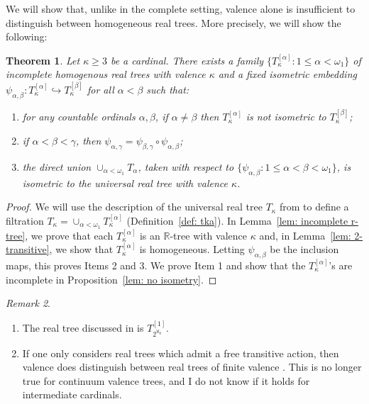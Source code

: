 \documentclass[11pt]{article}
\newtheorem{theorem}{Theorem}[section]
\theoremstyle{definition}
\theoremstyle{remark}
\newtheorem{remark}[theorem]{Remark}
\begin{document}
We will show that, unlike in the complete setting, valence alone is insufficient to distinguish between homogeneous real trees. More precisely, we will show the following:

\begin{theorem}
    Let $\kappa \geq 3$ be a cardinal. There exists a family $\{T_\kappa^{[\alpha]} : 1 \leq \alpha < \omega_1\}$ of incomplete homogenous real trees with valence $\kappa$ and a fixed isometric embedding $\psi_{\alpha,\beta}: T_\kappa^{[\alpha]} \hookrightarrow T_\kappa^{[\beta]}$ for all $\alpha < \beta$ such that:
    \begin{enumerate}
        \item for any countable ordinals $\alpha, \beta$, if $\alpha \neq \beta$ then $T_\kappa^{[\alpha]}$ is not isometric to $T_\kappa^{[\beta]}$;
        \item if $\alpha < \beta < \gamma$, then $\psi_{\alpha,\gamma} = \psi_{\beta,\gamma} \circ \psi_{\alpha,\beta}$;
        \item the direct union $\cup_{\alpha < \omega_1} T_\alpha$, taken with respect to $\{\psi_{\alpha,\beta} : 1 \leq \alpha < \beta < \omega_1\}$, is isometric to the universal real tree with valence $\kappa$.
    \end{enumerate}
\end{theorem}

\begin{proof}
	We will use the description of the universal real tree $T_\kappa$ from \cite{DyubinaExplicit01} to define a filtration $T_\kappa = \cup_{\alpha < \omega_1} T_\kappa^{[\alpha]}$ (Definition~\ref{def: tka}). In Lemma~\ref{lem: incomplete r-tree}, we prove that each $T_\kappa^{[\alpha]}$ is an $\mathbb{R}$-tree with valence $\kappa$ and, in Lemma~\ref{lem: 2-transitive}, we show that $T_\kappa^{[\alpha]}$ is homogeneous. Letting $\psi_{\alpha,\beta}$ be the inclusion maps, this proves Items 2 and 3. We prove Item 1 and show that the $T_\kappa^{[\alpha]}$'s are incomplete in Proposition~\ref{lem: no isometry}.
\end{proof}

\begin{remark}
    \begin{enumerate}
        \item The real tree discussed in \cite{BerestovskiuiUryson19} is $T_{2^{\aleph_0}}^{[1]}$.
        \item If one only considers real trees which admit a free transitive action, then valence does distinguish between real trees of finite valence \cite[Theorem~C]{AzuelosGuide25}. This is no longer true for continuum valence trees, and I do not know if it holds for intermediate cardinals.
    \end{enumerate}
\end{remark}
\end{document}
